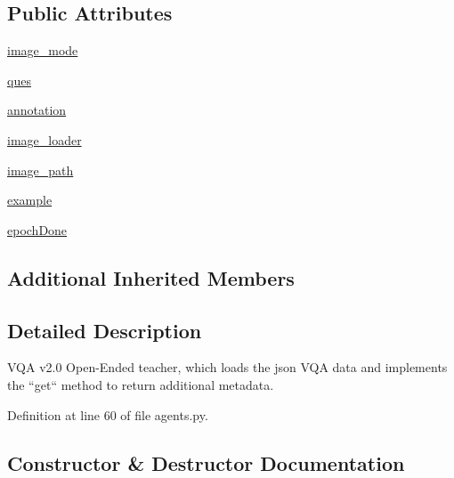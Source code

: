 \subsection*{Public Attributes}
\begin{DoxyCompactItemize}
\item 
\hyperlink{classparlai_1_1tasks_1_1vqa__v2_1_1agents_1_1OeTeacher_a8f3225181d7dd82bc4f6356a45377e77}{image\+\_\+mode}
\item 
\hyperlink{classparlai_1_1tasks_1_1vqa__v2_1_1agents_1_1OeTeacher_a97e56f91309795ad390573355585a2f3}{ques}
\item 
\hyperlink{classparlai_1_1tasks_1_1vqa__v2_1_1agents_1_1OeTeacher_ad195c1182da5744f020d6181a7b99218}{annotation}
\item 
\hyperlink{classparlai_1_1tasks_1_1vqa__v2_1_1agents_1_1OeTeacher_a432beaf6869117f7ed76cb78d876996a}{image\+\_\+loader}
\item 
\hyperlink{classparlai_1_1tasks_1_1vqa__v2_1_1agents_1_1OeTeacher_a7a1259d5b801f1e7984700a31405189f}{image\+\_\+path}
\item 
\hyperlink{classparlai_1_1tasks_1_1vqa__v2_1_1agents_1_1OeTeacher_a949cbafa55cf6c1175a90c3b54d68426}{example}
\item 
\hyperlink{classparlai_1_1tasks_1_1vqa__v2_1_1agents_1_1OeTeacher_ae8240944a80920ce505269347bea3c6b}{epoch\+Done}
\end{DoxyCompactItemize}
\subsection*{Additional Inherited Members}


\subsection{Detailed Description}
\begin{DoxyVerb}VQA v2.0 Open-Ended teacher, which loads the json VQA data and
implements the ``get`` method to return additional metadata.
\end{DoxyVerb}
 

Definition at line 60 of file agents.\+py.



\subsection{Constructor \& Destructor Documentation}
\mbox{\label{classparlai_1_1tasks_1_1vqa__v2_1_1agents_1_1OeTeacher_ae97aade64cf9108a8cb022721a13ebd4}} 
